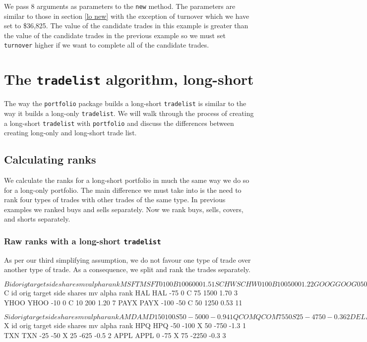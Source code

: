 \documentclass{article}
\begin{document}
We pass 8 arguments as parameters to the \texttt{new} method.  The
parameters are similar to those in section \ref{lo new} with the
exception of turnover which we have set to
\$36,825.  The value of the
candidate trades in this example is greater than the value of the
candidate trades in the previous example so we must set
\texttt{turnover} higher if we want to complete all of the candidate
trades.

\section{The \texttt{tradelist} algorithm, long-short}

The way the \texttt{portfolio} package builds a long-short
\texttt{tradelist} is similar to the way it builds a long-only
\texttt{tradelist}.  We will walk through the process
of creating a long-short \texttt{tradelist} with \texttt{portfolio}
and discuss the differences between creating long-only and long-short
trade list.

\subsection{Calculating ranks}
 
We calculate the ranks for a long-short portfolio in much the same way
we do so for a long-only portfolio.  The main difference we must take
into is the need to rank four types of trades with other trades of the
same type.  In previous examples we ranked buys and sells separately.
Now we rank buys, sells, covers, and shorts separately.

\subsubsection{Raw ranks with a long-short \texttt{tradelist}}

As per our third simplifying assumption, we do not favour one type of
trade over another type of trade.  As a consequence, we split and rank
the trades separately.

\begin{Schunk}
\begin{Soutput}
$B
       id orig target side shares   mv alpha rank
MSFT MSFT    0    100    B    100 6000   1.5    1
SCHW SCHW    0    100    B    100 5000   1.2    2
GOOG GOOG    0     50    B     50 1000   1.1    3
GM     GM  100    200    B    100 3000   1.0    4

$C
       id orig target side shares   mv alpha rank
HAL   HAL  -75      0    C     75 1500  1.70    3
YHOO YHOO  -10      0    C     10  200  1.20    7
PAYX PAYX -100    -50    C     50 1250  0.53   11

$S
       id orig target side shares    mv alpha rank
AMD   AMD  150    100    S     50 -5000 -0.94    1
QCOM QCOM   75     50    S     25 -4750 -0.36    2
DELL DELL   50      0    S     50 -5500 -0.15    3

$X
       id orig target side shares    mv alpha rank
HPQ   HPQ  -50   -100    X     50  -750  -1.3    1
TXN   TXN  -25    -50    X     25  -625  -0.5    2
APPL APPL    0    -75    X     75 -2250  -0.3    3
\end{Soutput}
\end{Schunk}
\end{document}
